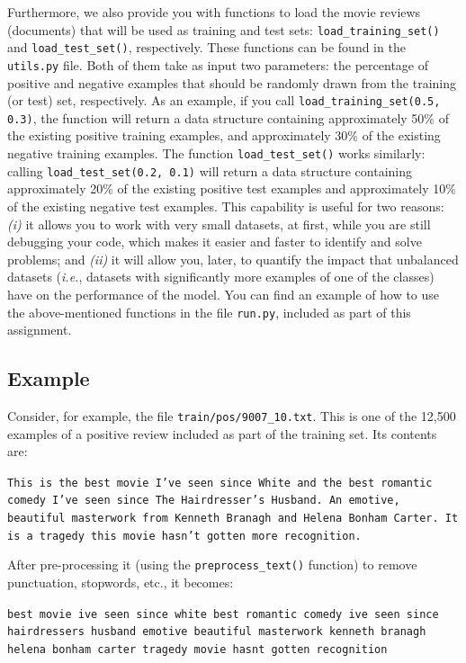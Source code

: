 \documentclass[letterpaper]{article}
\begin{document}
Furthermore, we also provide you with functions to load the movie reviews (documents) that will be used as training and test sets: \texttt{load\_training\_set()} and \texttt{load\_test\_set()}, respectively. These functions can be found in the \texttt{utils.py} file. Both of them take as input two parameters: the percentage of positive and negative examples that should be randomly drawn from the training (or test) set, respectively. As an example, if you call \texttt{load\_training\_set(0.5, 0.3)}, the function will return a data structure containing approximately 50\% of the existing positive training examples, and approximately 30\% of the existing negative training examples. The function \texttt{load\_test\_set()} works similarly: calling \texttt{load\_test\_set(0.2, 0.1)} will return a data structure containing approximately 20\% of the existing positive test examples and approximately 10\% of the existing negative test examples. This capability is useful for two reasons: \textit{(i)} it allows you to work with very small datasets, at first, while you are still debugging your code, which makes it easier and faster to identify and solve problems; and \textit{(ii)} it will allow you, later, to quantify the impact that unbalanced datasets (\textit{i.e.}, datasets with significantly more examples of one of the classes) have on the performance of the model. You can find an example of how to use the above-mentioned functions in the file \texttt{run.py}, included as part of this assignment.

\subsection{Example}

Consider, for example, the file \texttt{train/pos/9007\_10.txt}. This is one of the 12,500 examples of a positive review included as part of the training set. Its contents are:

\noindent \texttt{This is the best movie I've seen since White and the best romantic comedy I've seen since The Hairdresser's Husband. An emotive, beautiful masterwork from Kenneth Branagh and Helena Bonham Carter. It is a tragedy this movie hasn't gotten more recognition.}

After pre-processing it (using the \texttt{preprocess\_text()} function) to remove punctuation, stopwords, etc., it becomes:

\noindent \texttt{best movie ive seen since white best romantic comedy ive seen since hairdressers husband emotive beautiful masterwork kenneth branagh helena bonham carter tragedy movie hasnt gotten recognition}
\end{document}
